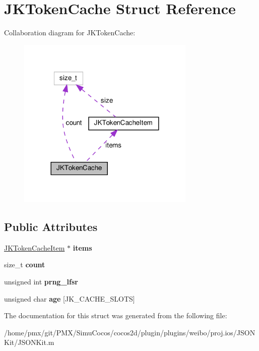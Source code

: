 \hypertarget{structJKTokenCache}{}\section{J\+K\+Token\+Cache Struct Reference}
\label{structJKTokenCache}


Collaboration diagram for J\+K\+Token\+Cache\+:
\nopagebreak
\begin{figure}[H]
\begin{center}
\leavevmode
\includegraphics[width=240pt]{structJKTokenCache__coll__graph}
\end{center}
\end{figure}
\subsection*{Public Attributes}
\begin{DoxyCompactItemize}
\item 
\mbox{\label{structJKTokenCache_a80b3a1d112b7d798309a71ae3335ab9e}} 
\hyperlink{structJKTokenCacheItem}{J\+K\+Token\+Cache\+Item} $\ast$ {\bfseries items}
\item 
\mbox{\label{structJKTokenCache_a064f4270180ca06ecb5aa14d3b47f2d1}} 
size\+\_\+t {\bfseries count}
\item 
\mbox{\label{structJKTokenCache_a02ed24d19e7b1f837d57a4847acee4bb}} 
unsigned int {\bfseries prng\+\_\+lfsr}
\item 
\mbox{\label{structJKTokenCache_a2cb844821594c94a3d1cd512faa9d66e}} 
unsigned char {\bfseries age} \mbox{[}J\+K\+\_\+\+C\+A\+C\+H\+E\+\_\+\+S\+L\+O\+TS\mbox{]}
\end{DoxyCompactItemize}


The documentation for this struct was generated from the following file\+:\begin{DoxyCompactItemize}
\item 
/home/pmx/git/\+P\+M\+X/\+Simu\+Cocos/cocos2d/plugin/plugins/weibo/proj.\+ios/\+J\+S\+O\+N\+Kit/J\+S\+O\+N\+Kit.\+m\end{DoxyCompactItemize}
